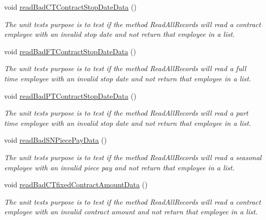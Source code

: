 \begin{DoxyCompactItemize}
void \hyperlink{class_file_i_o_tests_1_1_file_i_o_tests_a6868dfec978501a6b229448ad52cd739}{read\+Bad\+C\+T\+Contract\+Stop\+Date\+Data} ()
\begin{DoxyCompactList}\small\item\em The unit test\textquotesingle{}s purpose is to test if the method Read\+All\+Records will read a contract employee with an invalid stop date and not return that employee in a list. \end{DoxyCompactList}\item 
void \hyperlink{class_file_i_o_tests_1_1_file_i_o_tests_ae165da96652fbc78738b73b24039c98c}{read\+Bad\+F\+T\+Contract\+Stop\+Date\+Data} ()
\begin{DoxyCompactList}\small\item\em The unit test\textquotesingle{}s purpose is to test if the method Read\+All\+Records will read a full time employee with an invalid stop date and not return that employee in a list. \end{DoxyCompactList}\item 
void \hyperlink{class_file_i_o_tests_1_1_file_i_o_tests_a435a53b04da8e49cbfe4cd61eacfc43a}{read\+Bad\+P\+T\+Contract\+Stop\+Date\+Data} ()
\begin{DoxyCompactList}\small\item\em The unit test\textquotesingle{}s purpose is to test if the method Read\+All\+Records will read a part time employee with an invalid stop date and not return that employee in a list. \end{DoxyCompactList}\item 
void \hyperlink{class_file_i_o_tests_1_1_file_i_o_tests_afd9078725a0f46f01d090dc668e94ab0}{read\+Bad\+S\+N\+Piece\+Pay\+Data} ()
\begin{DoxyCompactList}\small\item\em The unit test\textquotesingle{}s purpose is to test if the method Read\+All\+Records will read a seasonal employee with an invalid piece pay and not return that employee in a list. \end{DoxyCompactList}\item 
void \hyperlink{class_file_i_o_tests_1_1_file_i_o_tests_adc390277bbcc6105ef453ffb70baea2e}{read\+Bad\+C\+Tfixed\+Contract\+Amount\+Data} ()
\begin{DoxyCompactList}\small\item\em The unit test\textquotesingle{}s purpose is to test if the method Read\+All\+Records will read a contract employee with an invalid contract amount and not return that employee in a list. \end{DoxyCompactList}\item 

\end{DoxyCompactItemize}
